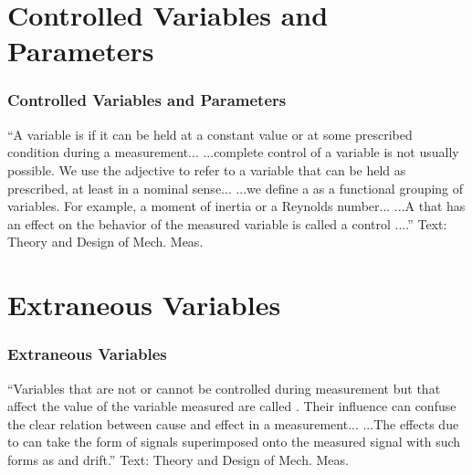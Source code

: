 \documentclass[fleqn]{beamer} %
\newcommand{\sectiontitleIII}{Controlled Variables and Parameters}
\newcommand{\sectiontitleIV}{Extraneous Variables}
\begin{document}
\section{\sectiontitleIII}
	\begin{frame}[label=sectionIII]
		\frametitle{\sectiontitleIII}

		{``A variable is {\BL \hspcu} if it can be held at a constant value
		or at some prescribed condition during a measurement... ...complete control of a variable is not usually
		possible. We use the adjective {\BL \hspcu} to refer to a variable that can be held as prescribed, at
		least in a nominal sense... \vspc
		...we define a {\GR \hspcu} as a functional grouping of variables. For example, a moment of inertia or a Reynolds number... ...A {\GR \hspcu} that has an effect on the behavior of the measured variable is called a control \hspcu....''} \vspc
		{\tiny Text: Theory and Design of Mech. Meas.}

	\end{frame}

\section{\sectiontitleIV}
	\begin{frame}[label=sectionIV]
		\frametitle{\sectiontitleIV}

		{``Variables that are not or cannot be controlled during measurement but that affect the value of the
		variable measured are called {\RD \hspcu\hspc\hspcu}. Their influence can confuse the clear relation
		between cause and effect in a measurement... ...The effects due to {\RD \hspcu\hspc\hspcu} can take the form of signals superimposed
		onto the measured signal with such forms as {\PR \hspcu} and drift.''} \vspc
		{\tiny Text: Theory and Design of Mech. Meas.}

	\end{frame}

\end{document}
